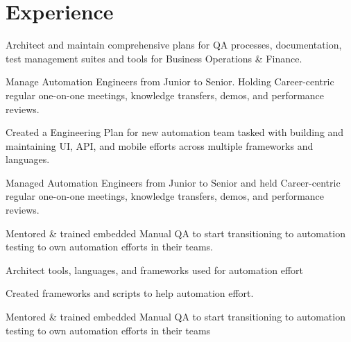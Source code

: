 \documentclass[]{deedy-resume-openfont}
\begin{document}
\begin{minipage}[t]{0.66\textwidth} 
\section{Experience}
\vspace{\topsep} %
\begin{tightemize}
\item Architect and maintain comprehensive plans for QA processes, documentation, test management suites and tools for Business Operations \& Finance. 
\item Manage Automation Engineers from Junior to Senior. Holding Career-centric regular one-on-one meetings, knowledge transfers, demos, and performance reviews.
\end{tightemize}
\vspace{\topsep} %
\begin{tightemize}
\item Created a Engineering Plan for new automation team tasked with building and maintaining UI, API, and mobile efforts across multiple frameworks and languages.
\item Managed Automation Engineers from Junior to Senior and held Career-centric regular one-on-one meetings, knowledge transfers, demos, and performance reviews.
\item Mentored \& trained embedded Manual QA to start transitioning to automation testing to own automation efforts in their teams.
\item Architect tools, languages, and frameworks used for automation effort
\end{tightemize}
\vspace{\topsep} %
\begin{tightemize}
\item Created frameworks and scripts to help automation effort.
\item Mentored \& trained embedded Manual QA to start transitioning to automation testing to own automation efforts in their teams

\end{tightemize}
\end{minipage}
\end{document}
